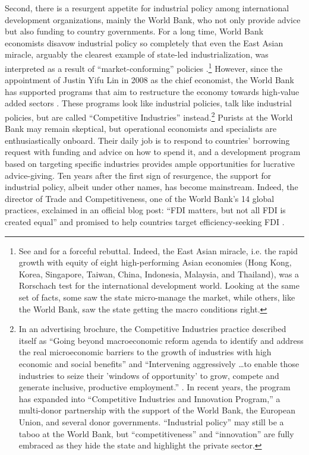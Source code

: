 Second, there is a resurgent appetite for industrial policy among international
development organizations, mainly the World Bank, who not only provide advice
but also funding to country governments. For a long time, World Bank economists
disavow industrial policy so completely that even the East Asian miracle,
arguably the clearest example of state-led industrialization, was interpreted as
a result of ``market-conforming'' policies
\citep[355]{WorldBank1993}.\footnote{See \citet{Amsden1994} and
  \citet{Rodrik1994} for a forceful rebuttal. Indeed, the East Asian miracle,
  i.e. the rapid growth with equity of eight high-performing Asian economies
  (Hong Kong, Korea, Singapore, Taiwan, China, Indonesia, Malaysia, and
  Thailand), was a Rorschach test for the international development world.
  Looking at the same set of facts, some saw the state micro-manage the market,
  while others, like the World Bank, saw the state getting the macro conditions
  right.} However, since the appointment of Justin Yifu Lin in 2008 as the chief
economist, the World Bank has supported programs that aim to restructure the
economy towards high-value added sectors \citep{Wade2012}. These programs look
like industrial policies, talk like industrial policies, but are called
``Competitive Industries'' instead.\footnote{In an advertising brochure, the
  Competitive Industries practice described itself as ``Going beyond
  macroeconomic reform agenda to identify and address the real microeconomic
  barriers to the growth of industries with high economic and social benefits''
  and ``Intervening aggressively \ldots to enable those industries to seize
  their 'windows of opportunity' to grow, compete and generate inclusive,
  productive employment.'' \citep{WorldBank2011}. In recent years, the program
  has expanded into ``Competitive Industries and Innovation Program,'' a
  multi-donor partnership with the support of the World Bank, the European
  Union, and several donor governments. ``Industrial policy'' may still be a
  taboo at the World Bank, but ``competitiveness'' and ``innovation'' are fully
  embraced as they hide the state and highlight the private sector.} Purists at
the World Bank may remain skeptical, but operational economists and specialists
are enthusiastically onboard. Their daily job is to respond to countries'
borrowing request with funding and advice on how to spend it, and a development
program based on targeting specific industries provides ample opportunities for
lucrative advice-giving. Ten years after the first sign of resurgence, the
support for industrial policy, albeit under other names, has become mainstream.
Indeed, the director of Trade and Competitiveness, one of the World Bank's 14
global practices, exclaimed in an official blog post: ``FDI matters, but not all
FDI is created equal'' and promised to help countries target efficiency-seeking
FDI \citep{Fruman2016}.

